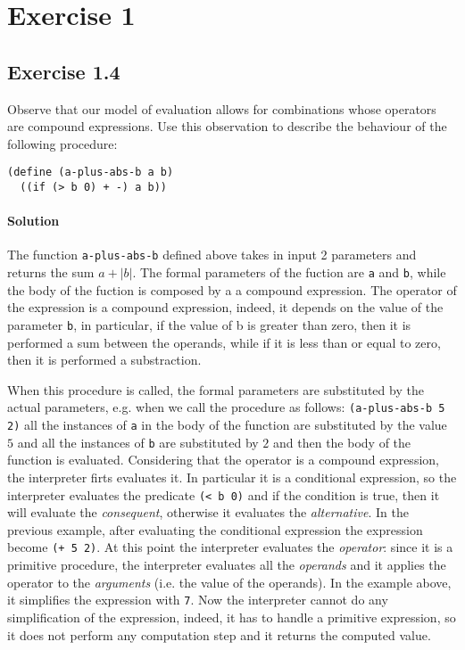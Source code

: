 \section*{Exercise 1}

\subsection*{Exercise 1.4}
Observe that our model of evaluation allows for combinations whose operators are compound expressions. Use this observation to 
describe the behaviour of the following procedure:

\begin{lstlisting}
(define (a-plus-abs-b a b) 
  ((if (> b 0) + -) a b))
\end{lstlisting}

\paragraph{Solution}
The function \texttt{a-plus-abs-b} defined above takes in input 2 parameters and returns the sum $ a + |b| $. 
The formal parameters of the fuction are \texttt{a} and \texttt{b}, while the body of the fuction is composed by a 
a compound expression. The operator of the expression is a compound expression, indeed, it depends on the value of the
parameter \texttt{b}, in particular, if the value of {b} is greater than zero, then it is performed a sum between the 
operands, while if it is less than or equal to zero, then it is performed a substraction.

When this procedure is called, the formal parameters are substituted by the actual parameters, e.g. when we call the procedure as
follows: \texttt{(a-plus-abs-b 5 2)} all the instances of \texttt{a} in the body of the function are substituted by the value
$ 5 $ and all the instances of \texttt{b} are substituted by $ 2 $ and then the body of the function is evaluated.
Considering that the operator is a compound expression, the interpreter firts evaluates it. 
In particular it is a conditional  expression, so the interpreter evaluates the predicate \texttt{(< b 0)} 
and if the condition is true, then it will evaluate the \textit{consequent}, otherwise it evaluates the \textit{alternative}.
In the previous example, after evaluating the conditional expression the expression become \texttt{(+ 5 2)}.
At this point the interpreter evaluates the \textit{operator}: since it is a primitive procedure, the interpreter evaluates all the 
\textit{operands} and it applies the operator to the \textit{arguments} (i.e. the value of the operands).
In the example above, it simplifies the expression with \texttt{7}.
Now the interpreter cannot do any simplification of the expression, indeed, it has to handle a primitive expression, so 
it does not perform any computation step and it returns the computed value.


